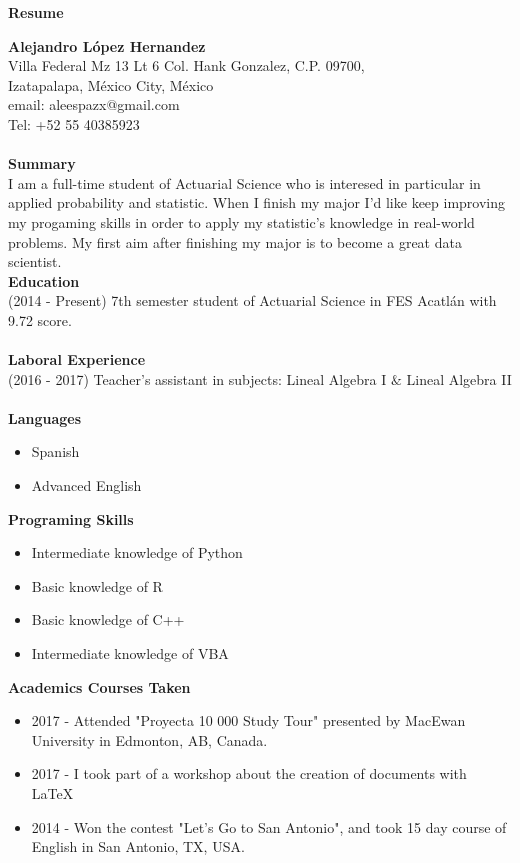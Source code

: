 \documentclass[11pt,letter]{article}
\begin{document}
\begin{center}
\textbf{Resume}
\end{center}
\textbf{Alejandro López Hernandez} \\ 
Villa Federal Mz 13 Lt 6 Col. Hank Gonzalez, C.P. 09700, \\Izatapalapa, México City, México\\ email: aleespazx@gmail.com\\Tel: +52 55 40385923\\\\
\textbf{Summary}\\
I am a full-time student of Actuarial Science who is interesed in particular in applied probability and statistic. When I finish my major I'd like keep improving my progaming skills in order to apply my statistic's knowledge in real-world problems. My first aim after finishing my major is to become a great data scientist.\\
\textbf{Education}\\
(2014 - Present) 7th semester student of Actuarial Science in FES Acatlán with 9.72 score.\\\\
\textbf{Laboral Experience}\\
(2016 - 2017) Teacher's assistant in subjects: Lineal Algebra I $\&$ Lineal Algebra II\\\\
\textbf{Languages}
\begin{itemize}
\item Spanish
\item Advanced English
\end{itemize}
\textbf{Programing Skills}
\begin{itemize}
\item Intermediate knowledge of Python
\item Basic knowledge of R
\item Basic knowledge of C++
\item Intermediate knowledge of VBA
\end{itemize}
\textbf{Academics Courses Taken}
\begin{itemize}
\item 2017 - Attended "Proyecta 10 000 Study Tour" presented by MacEwan University in Edmonton, AB, Canada.
\item 2017 - I took part of a workshop about the creation of  documents with LaTeX
\item 2014 - Won the contest "Let's Go to San Antonio", and took 15 day course of English in San Antonio, TX, USA. 
\end{itemize}
\end{document}
